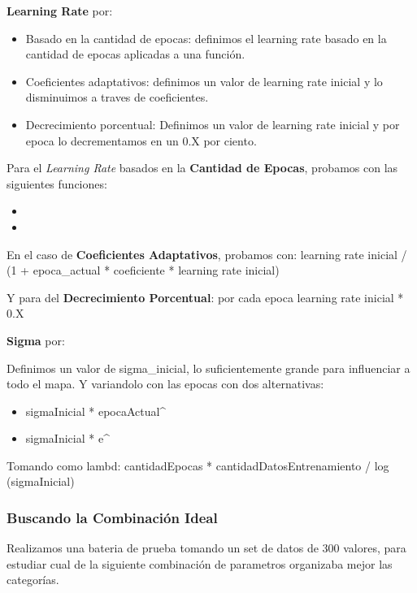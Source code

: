 \textbf{Learning Rate} por:

\begin{itemize}
	\item Basado en la cantidad de epocas: definimos el learning
rate basado en la cantidad de epocas aplicadas a una función.
	\item Coeficientes adaptativos: definimos un valor de
learning rate inicial y lo disminuimos a traves de coeficientes.
	\item Decrecimiento porcentual: Definimos un valor de 
learning rate inicial y por epoca lo decrementamos en un 0.X por ciento.
\end{itemize}

Para el \emph{Learning Rate} basados en la \textbf{Cantidad de Epocas}, probamos con 
las siguientes funciones:

\begin{itemize}
	\item {}
	\item {}
\end{itemize}

En el caso de \textbf{Coeficientes Adaptativos}, probamos con:
learning rate inicial / (1 + epoca_actual * coeficiente * learning rate inicial)

Y para del \textbf{Decrecimiento Porcentual}: por cada epoca learning rate inicial * 0.X


\textbf{Sigma} por:

Definimos un valor de sigma_inicial, lo suficientemente grande para influenciar a todo 
el mapa. Y variandolo con las epocas con dos alternativas:

\begin{itemize}
	\item sigmaInicial * {epocaActual^}
	\item sigmaInicial * e^
\end{itemize}

Tomando como lambd: cantidadEpocas * cantidadDatosEntrenamiento / log (sigmaInicial)


\subsubsection{Buscando la Combinación Ideal}

Realizamos una bateria de prueba tomando un set de datos de 300 valores, para
estudiar cual de la siguiente combinación de parametros organizaba mejor
las categorías.

